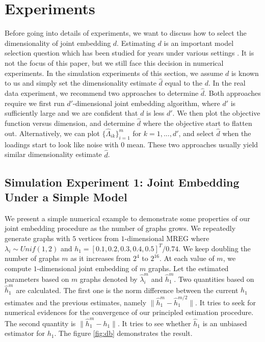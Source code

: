 \documentclass[10pt,journal,compsoc]{IEEEtran}
\begin{document}
\section{Experiments}
Before going into details of experiments, we want to discuss how to select the dimensionality of joint embedding $d$. Estimating $d$ is an important model selection question which has been studied for years under various settings \cite{kohavi1995study}. It is not the focus of this paper, but we still face this decision in numerical experiments. In the simulation experiments of this section, we assume $d$ is known to us and simply set the dimensionality estimate $\hat{d}$ equal to the $d$. In the real data experiment, we recommend two approaches to determine $\hat{d}$. Both approaches require we first run $d'$-dimensional joint embedding algorithm, where $d'$ is sufficiently large and we are confident that $d$ is less $d'$. We then plot the objective function versus dimension, and determine $\hat{d}$ where the objective start to flatten out. Alternatively, we can plot $\{\hat{\Lambda}_{ik}\}_{i=1}^m$ for $k=1,...,d'$, and select $\hat{d}$ when the loadings start to look like noise with $0$ mean. These two approaches usually yield similar dimensionality estimate $\hat{d}$. 

\subsection{Simulation Experiment 1: Joint Embedding Under a Simple Model}
\noindent We present a simple numerical example to demonstrate some properties
of our joint embedding procedure as the number of graphs grows. We repeatedly generate graphs with $5$ vertices from $1$-dimensional MREG where $\lambda_i \sim Unif(1,2)$ and $h_1=[0.1,0.2,0.3,0.4,0.5]^T/0.74$. We keep doubling the number of graphs $m$ as it increases from $2^4$ to $2^{16}$. At each value of $m$, we compute $1$-dimensional joint embedding of $m$ graphs. Let the estimated parameters based on $m$ graphs denoted by $\hat{\lambda}_i^m$ and $\hat{h}_1^m$. Two quantities based on $\hat{h}_1^m$ are calculated. The first one is the norm difference between the current $h_1$ estimates and the previous estimates, namely $\|\hat{h}_1^m-\hat{h}_1^{m/2}\|$. It tries to seek for numerical evidences for the convergence of our principled estimation procedure. The second quantity is $\|\hat{h}^m_1-h_1\|$. It tries to see whether $\hat{h}_1$ is an unbiased estimator for $h_1$. The figure \ref{fig:db} demonstrates the result. \\
\end{document}
